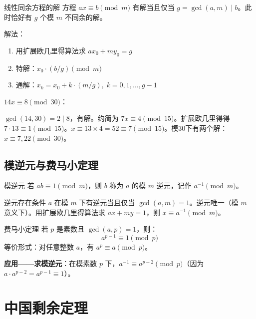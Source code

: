\begin{myTheorem}{线性同余方程的解}
方程 \(ax\equiv b\pmod{m}\) 有解当且仅当 \(g=\gcd(a,m)\mid b\)。此时恰好有 \(g\) 个模 \(m\) 不同余的解。
\end{myTheorem}

解法：
\begin{enumerate}
    \item 用扩展欧几里得算法求 \(ax_0+my_0=g\)
    \item 特解：\(x_0\cdot(b/g)\pmod{m}\)
    \item 通解：\(x_k = x_0 + k\cdot(m/g),\;k=0,1,\dots,g-1\)
\end{enumerate}

\begin{example}
\(14x\equiv 8\pmod{30}\)：

\(\gcd(14,30)=2\mid 8\)，有解。约简为 \(7x\equiv 4\pmod{15}\)。扩展欧几里得得 \(7\cdot13\equiv1\pmod{15}\)。\(x\equiv13\times4=52\equiv7\pmod{15}\)。模30下有两个解：\(x\equiv7,22\pmod{30}\)。
\end{example}

\subsection{模逆元与费马小定理}

\begin{mydefinition}{模逆元}
若 \(ab\equiv1\pmod{m}\)，则 \(b\) 称为 \(a\) 的模 \(m\) 逆元，记作 \(a^{-1}\pmod{m}\)。
\end{mydefinition}

\begin{myTheorem}{逆元存在条件}
\(a\) 在模 \(m\) 下有逆元当且仅当 \(\gcd(a,m)=1\)。逆元唯一（模 \(m\) 意义下）。用扩展欧几里得算法求 \(ax+my=1\)，则 \(x\equiv a^{-1}\pmod{m}\)。
\end{myTheorem}

\begin{myTheorem}{费马小定理}
若 \(p\) 是素数且 \(\gcd(a,p)=1\)，则：
\[
a^{p-1} \equiv 1 \pmod{p}
\]
等价形式：对任意整数 \(a\)，有 \(a^p\equiv a\pmod{p}\)。
\end{myTheorem}

\textbf{应用——求模逆元}：在模素数 \(p\) 下，\(a^{-1}\equiv a^{p-2}\pmod{p}\)（因为 \(a\cdot a^{p-2}=a^{p-1}\equiv1\)）。

\section{中国剩余定理}

